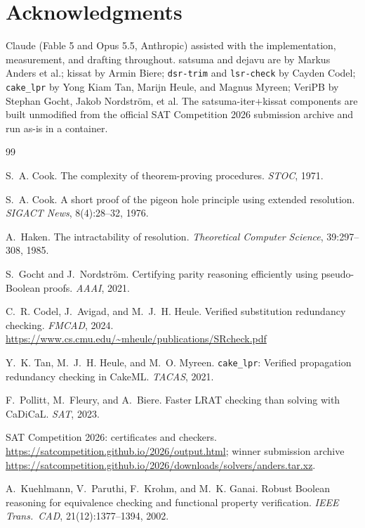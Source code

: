 \documentclass[10pt]{article}
\begin{document}
\section*{Acknowledgments}

Claude (Fable 5 and Opus 5.5, Anthropic) assisted with the implementation,
measurement, and drafting throughout. satsuma and dejavu are by
Markus Anders et al.; kissat by Armin Biere; \texttt{dsr-trim} and
\texttt{lsr-check} by Cayden Codel; \texttt{cake\_lpr} by Yong Kiam
Tan, Marijn Heule, and Magnus Myreen; VeriPB by Stephan Gocht, Jakob
Nordstr\"om, et al. The satsuma-iter+kissat components are built
unmodified from the official SAT Competition 2026 submission archive
and run as-is in a container.

\begin{thebibliography}{99}
\setlength{\itemsep}{2pt}

 S.~A. Cook.
\newblock The complexity of theorem-proving procedures.
\newblock \emph{STOC}, 1971.

 S.~A. Cook.
\newblock A short proof of the pigeon hole principle using extended
  resolution.
\newblock \emph{SIGACT News}, 8(4):28--32, 1976.

 A.~Haken.
\newblock The intractability of resolution.
\newblock \emph{Theoretical Computer Science}, 39:297--308, 1985.

 S.~Gocht and J.~Nordstr\"om.
\newblock Certifying parity reasoning efficiently using pseudo-Boolean
  proofs.
\newblock \emph{AAAI}, 2021.

 C.~R. Codel, J.~Avigad, and M.~J.~H. Heule.
\newblock Verified substitution redundancy checking.
\newblock \emph{FMCAD}, 2024.
\newblock \url{https://www.cs.cmu.edu/~mheule/publications/SRcheck.pdf}

 Y.~K. Tan, M.~J.~H. Heule, and M.~O. Myreen.
\newblock \texttt{cake\_lpr}: Verified propagation redundancy checking
  in CakeML.
\newblock \emph{TACAS}, 2021.

 F.~Pollitt, M.~Fleury, and A.~Biere.
\newblock Faster LRAT checking than solving with CaDiCaL.
\newblock \emph{SAT}, 2023.

 SAT Competition 2026: certificates and checkers.
\newblock \url{https://satcompetition.github.io/2026/output.html};
  winner submission archive
  \url{https://satcompetition.github.io/2026/downloads/solvers/anders.tar.xz}.

 A.~Kuehlmann, V.~Paruthi, F.~Krohm, and M.~K. Ganai.
\newblock Robust Boolean reasoning for equivalence checking and
  functional property verification.
\newblock \emph{IEEE Trans.\ CAD}, 21(12):1377--1394, 2002.


\end{thebibliography}
\end{document}
